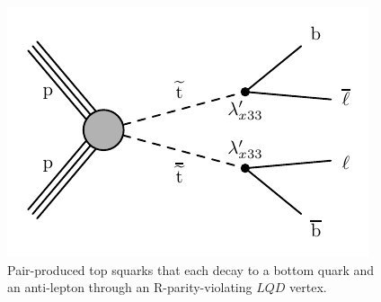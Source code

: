 \begin{figure}[hbtp]
\centering
\includegraphics[scale=1]{figures/intro/stopToLB.pdf}
\caption{Pair-produced top squarks that each decay to a bottom quark and an anti-lepton through an R-parity-violating $LQD$ vertex.}
\label{stop_to_lb}
\end{figure}